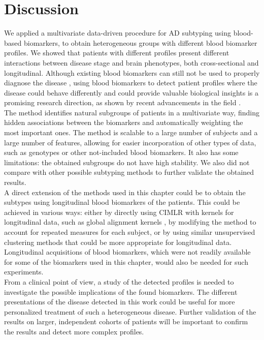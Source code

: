 \section{Discussion}
\label{conclusions}

We applied a multivariate data-driven procedure for AD subtyping using blood-based biomarkers, to obtain heterogeneous groups with different blood biomarker profiles. We showed that patients with different profiles present different interactions between disease stage and brain phenotypes, both cross-sectional and longitudinal. Although existing blood biomarkers can still not be used to properly diagnose the disease \cite{Schneider2009,Gupta2016,Lovheim2017}, using blood biomarkers to detect patient profiles where the disease could behave differently and could provide valuable biological insights is a promising research direction, as shown by recent advancements in the field \cite{Cullen2020,Moscoso2020,Karikari2020a}.  \\

The method identifies natural subgroups of patients in a multivariate way, finding hidden associations between the biomarkers and automatically weighting the most important ones. The method is scalable to a large number of subjects and a large number of features, allowing for easier incorporation of other types of data, such as genotypes or other not-included blood biomarkers. It also has some limitations: the obtained subgroups do not have high stability. We also did not compare with other possible subtyping methods to further validate the obtained results. \\

A direct extension of the methods used in this chapter could be to obtain the subtypes using longitudinal blood biomarkers of the patients. This could be achieved in various ways: either by directly using CIMLR with kernels for longitudinal data, such as global alignment kernels \cite{Cuturi2011}, by modifying the method to account for repeated measures for each subject, or by using similar unsupervised clustering methods that could be more appropriate for longitudinal data. Longitudinal acquisitions of blood biomarkers, which were not readily available for some of the biomarkers used in this chapter, would also be needed for such experiments. \\

From a clinical point of view, a study of the detected profiles is needed to investigate the possible implications of the found biomarkers. The different presentations of the disease detected in this work could be useful for more personalized treatment of such a heterogeneous disease. Further validation of the results on larger, independent cohorts of patients will be important to confirm the results and detect more complex profiles.  \\

